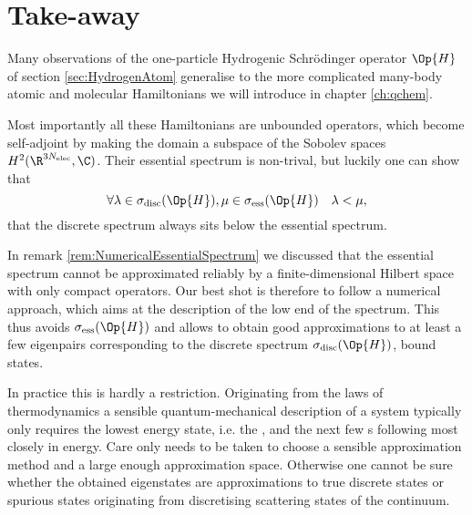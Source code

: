 \section{Take-away}
\label{sec:SpectralTakeAway}
Many observations of the one-particle Hydrogenic Schrödinger operator $\Op{H}$
of section \vref{sec:HydrogenAtom}
generalise to the more complicated many-body atomic and molecular Hamiltonians
we will introduce in chapter \vref{ch:qchem}.

Most importantly all these Hamiltonians are unbounded operators,
which become self-adjoint by making the domain
a subspace of the Sobolev spaces $H^2(\R^{3\Nelec}, \C)$.
Their essential spectrum is non-trival,
but luckily one can show~ that
\[ \forall \lambda \in \sigma_{\text{disc}}(\Op{H}),
	\mu \in \sigma_{\text{ess}}(\Op{H}) \quad \lambda < \mu, \]
\ie that the discrete spectrum always sits below the essential spectrum.

In remark \vref{rem:NumericalEssentialSpectrum} we discussed
that the essential spectrum cannot be approximated reliably
by a finite-dimensional Hilbert space with only compact operators.
Our best shot is therefore to follow a numerical approach,
which aims at the description of the low end of the spectrum.
This thus avoids $\sigma_{\text{ess}}(\Op{H})$
and allows to obtain good approximations to at least a few
eigenpairs corresponding to the discrete spectrum $\sigma_{\text{disc}}(\Op{H})$,
\ie bound states.

In practice this is hardly a restriction.
Originating from the laws of thermodynamics
a sensible quantum-mechanical description of a system
typically only requires the lowest energy state,
i.e. the , and the next few s
following most closely in energy.
Care only needs to be taken to choose a sensible approximation
method and a large enough approximation space.
Otherwise one cannot be sure whether the obtained eigenstates
are approximations to true discrete states
or spurious states originating from discretising scattering states
of the continuum.

